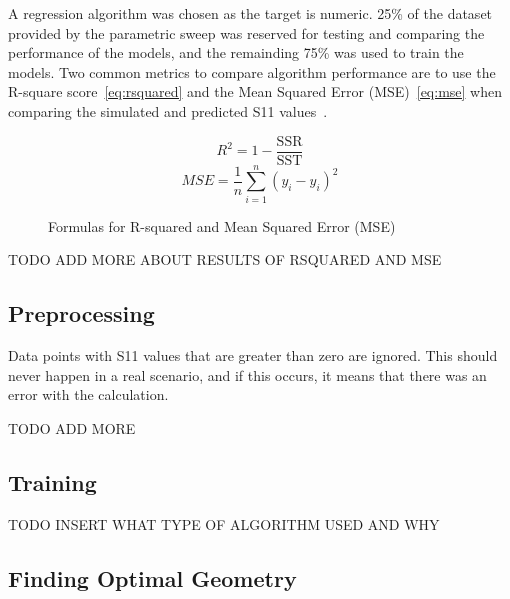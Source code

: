 \documentclass[lettersize,journal]{IEEEtran}
\begin{document}
A regression algorithm was chosen as the target is numeric. 25\% of the dataset provided by the parametric sweep was reserved for testing and comparing the performance of the models, and the remainding 75\% was used to train the models. Two common metrics to compare algorithm performance are to use the R-square score~\eqref{eq:rsquared} and the Mean Squared Error (MSE)~\eqref{eq:mse} when comparing the simulated and predicted S11 values~\cite{haque_machine_2023,m_el-kenawy_optimized_2022}. 

\begin{figure}
    \begin{equation}
        R^2 = 1 - \frac{\text{SSR}}{\text{SST}}
        \label{eq:rsquared}
    \end{equation}
    \begin{equation}
        {MSE} = \frac{1}{n} \sum_{i=1}^{n}(y_i - \hat{y}_i)^2
        \label{eq:mse}
    \end{equation}
    \caption{Formulas for R-squared and Mean Squared Error (MSE)}
\end{figure}


TODO ADD MORE ABOUT RESULTS OF RSQUARED AND MSE  

\subsection{Preprocessing}
Data points with S11 values that are greater than zero are ignored. This should never happen in a real scenario, and if this occurs, it means that there was an error with the calculation. 

TODO ADD MORE

\subsection{Training}

TODO INSERT WHAT TYPE OF ALGORITHM USED AND WHY

\subsection{Finding Optimal Geometry}
\end{document}
